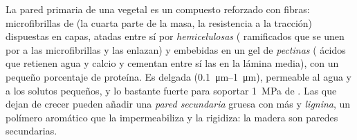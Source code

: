 \begin{proposition}\label{prop:b1:carbohydrates:wall}
La pared primaria de una  vegetal es un compuesto reforzado con
fibras: microfibrillas de  (la cuarta parte de la masa, la
resistencia a la tracción) dispuestas en capas, atadas entre sí por
\emph{hemicelulosas} ( ramificados que se unen por  a las microfibrillas y las enlazan) y embebidas en un gel de
\emph{pectinas} ( ácidos que retienen agua y calcio y cementan
entre sí las  en la lámina media), con un pequeño porcentaje de
proteína. Es delgada (\qtyrange{0.1}{1}{\micro m}), permeable al agua y a
los solutos pequeños, y lo bastante fuerte para soportar \qty{1}{MPa} de
. Las  que dejan de crecer pueden añadir una \emph{pared
secundaria} gruesa con más  y \emph{lignina}, un polímero aromático
que la impermeabiliza y la rigidiza: la madera son paredes secundarias.
\end{proposition}

